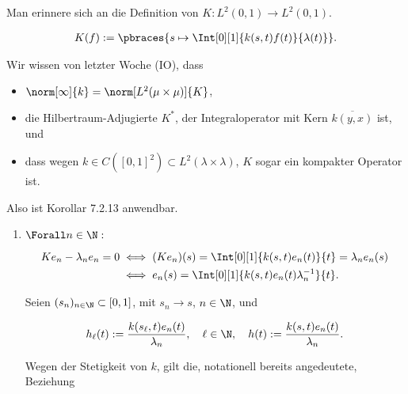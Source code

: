 \begin{solution}

Man erinnere sich an die Definition von $K: L^2(0, 1) \to L^2(0, 1)$.

\begin{align*}
  K(f) :=
  \pbraces
  {
    s
    \mapsto
    \Int[0][1]{k(s, t)f(t)}{\lambda(t)}
  }.
\end{align*}

Wir wissen von letzter Woche (IO), dass

\begin{itemize}

  \item
  $\norm[\infty]{k} = \norm[L^2(\mu \times \mu)]{K}$,

  \item
  die Hilbertraum-Adjugierte $K^\ast$, der Integraloperator mit Kern $\overline{k(y,x)}$ ist, und

  \item
  dass wegen $k \in C([0, 1]^2) \subset L^2(\lambda \times \lambda)$, $K$ sogar ein kompakter Operator ist.

\end{itemize}


Also ist Korollar 7.2.13 anwendbar.

\begin{enumerate}[label = (\alph*)]

  \item
  $\Forall n \in \N:$

  \begin{align*}
    K e_n - \lambda_n e_n = 0
    & \iff
    (K e_n)(s)
    =
    \Int[0][1]{k(s, t)e_n(t)}{t}
    =
    \lambda_n e_n(s) \\
    & \iff
    e_n(s)
    =
    \Int[0][1]
    {k(s, t) e_n(t) \lambda_n^{-1}}{t}.
  \end{align*}

  Seien $(s_n)_{n \in \N} \subset [0, 1]$, mit $s_n \to s$, $n \in \N$, und

  \begin{align*}
    h_\ell(t)
    :=
    \frac{k(s_\ell, t) e_n(t)}{\lambda_n},
    \quad
    \ell \in \N,
    \quad
    h(t)
    :=
    \frac{k(s, t) e_n(t)}{\lambda_n}.
  \end{align*}

  Wegen der Stetigkeit von $k$, gilt die, notationell bereits angedeutete, Beziehung


\end{enumerate}
\end{solution}
